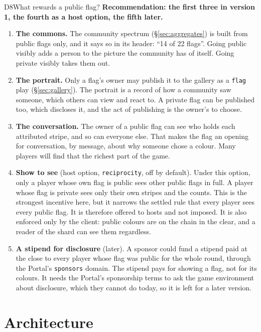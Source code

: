 \documentclass[11pt,a4paper]{article}
\newcommand{\code}[1]{\texttt{#1}}
\begin{document}
\begin{decision}{D8}{What rewards a public flag?}
\textbf{Recommendation: the first three in version 1, the fourth as a host option, the fifth
later.}
\begin{enumerate}[leftmargin=1.4em,itemsep=2pt]
\item \textbf{The commons.} The community spectrum (\S\ref{sec:aggregates}) is built from
  public flags only, and it says so in its header: ``14 of 22 flags''. Going public visibly adds
  a person to the picture the community has of itself. Going private visibly takes them out.
\item \textbf{The portrait.} Only a flag's owner may publish it to the gallery as a \code{flag}
  play (\S\ref{sec:gallery}). The portrait is a record of how a community saw someone, which
  others can view and react to. A private flag can be published too, which discloses it, and
  the act of publishing is the owner's to choose.
\item \textbf{The conversation.} The owner of a public flag can see who holds each attributed
  stripe, and so can everyone else. That makes the flag an opening for conversation, by message,
  about why someone chose a colour. Many players will find that the richest part of the game.
\item \textbf{Show to see} (host option, \code{reciprocity}, off by default). Under this
  option, only a player whose own flag is public sees other public flags in full. A player whose
  flag is private sees only their own stripes and the counts. This is the strongest incentive
  here, but it narrows the settled rule that every player sees every public flag. It is
  therefore offered to hosts and not imposed. It is also enforced only by the client: public
  colours are on the chain in the clear, and a reader of the shard can see them regardless.
\item \textbf{A stipend for disclosure} (later). A sponsor could fund a stipend paid at the close
  to every player whose flag was public for the whole round, through the Portal's
  \code{sponsors} domain. The stipend pays for showing a flag, not for its colours. It needs the
  Portal's sponsorship terms to ask the game environment about disclosure, which they cannot do
  today, so it is left for a later version.
\end{enumerate}
\end{decision}

\section{Architecture}\label{sec:arch}
\end{document}
